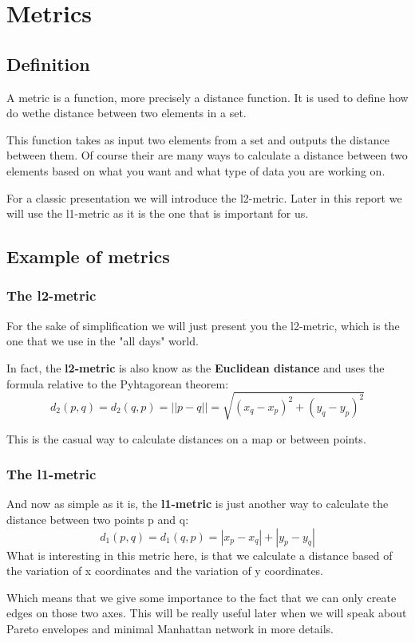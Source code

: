 \chapter{Metrics}
\section{Definition}%
A metric is a function, more precisely a distance function. It is used to define how do wethe distance between two elements in a set.

This function takes as input two elements from a set and outputs the distance between them. Of course their are many ways to calculate a distance between two elements based on what you want and what type of data you are working on.

For a classic presentation we will introduce the l2-metric. Later in this report we will use the l1-metric as it is the one that is important for us.
\section{Example of metrics}%
\subsection{The l2-metric}%
For the sake of simplification we will just present you the l2-metric, which is the one that we use in the "all days" world.

In fact, the \textbf{l2-metric} is also know as the \textbf{Euclidean distance} and uses the formula relative to the Pyhtagorean theorem:
	\[d_2(p,q)= d_2(q,p) = ||p - q|| = \sqrt{(x_q-x_p)^2+(y_q-y_p)^2}\]
	
This is the casual way to calculate distances on a map or between points.
\subsection{The l1-metric}%
	And now as simple as it is, the \textbf{l1-metric} is just another way to calculate the distance between two points p and q:
	\[ d_{1}(p,q)= d_{1}(q,p) = |x_p-x_q|+|y_p-y_q|\]
What is interesting in this metric here, is that we calculate a distance based of the variation of x coordinates and the variation of y coordinates.

Which means that we give some importance to the fact that we can only create edges on those two axes. This will be really useful later when we will speak about Pareto envelopes and minimal Manhattan network in more details.